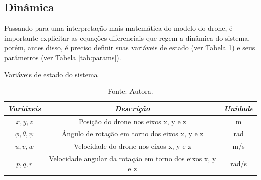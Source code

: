 \subsection{Dinâmica}
Passando para uma interpretação mais matemática do modelo do drone, é importante explicitar as equações diferenciais 
que regem a dinâmica do sistema, porém, antes disso, é preciso definir suas variáveis de estado (ver Tabela \ref{tab:vars}) 
e seus parâmetros (ver Tabela \ref{tab:params}).
\vspace{-0.3cm}
\begin{table}[h!]
    \centering
    \caption{Variáveis de estado do sistema} \vspace{-0.4cm}
    \begin{tabular}{|c|c|c|}
        \hline
        \emph{Variáveis} & \emph{Descrição} & \emph{Unidade} \\ \hline
        ${x, y, z}$& Posição do drone nos eixos x, y e z & m \\ \hline
        ${\phi, \theta, \psi}$& Ângulo de rotação em torno dos eixos x, y e z & rad \\ \hline
        ${u, v, w}$& Velocidade do drone nos eixos x, y e z & m/s \\ \hline
        ${p, q, r}$& Velocidade angular da rotação em torno dos eixos x, y e z & rad/s \\ \hline
    \end{tabular}
    \caption*{\footnotesize{Fonte: Autora.}}
    \label{tab:vars}
\end{table}

\vspace{-1.5cm}

